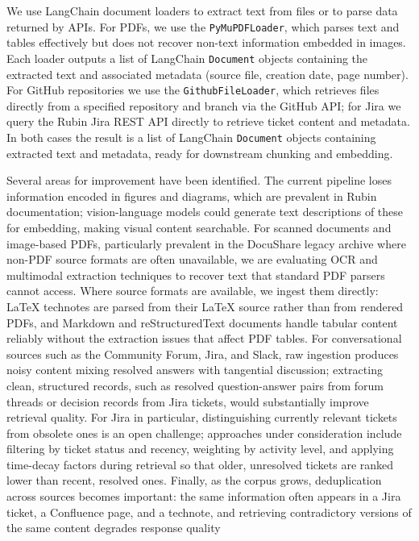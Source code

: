 We use LangChain document loaders to extract text from files or to parse data returned by APIs.
For PDFs, we use the \texttt{PyMuPDFLoader}, which parses text and tables effectively but does not recover non-text information embedded in images.
Each loader outputs a list of LangChain \texttt{Document} objects containing the extracted text and associated metadata (source file, creation date, page number).
For GitHub repositories we use the \texttt{GithubFileLoader}, which retrieves files directly from a specified repository and branch via the GitHub API; for Jira we query the Rubin Jira REST API directly to retrieve ticket content and metadata.
In both cases the result is a list of LangChain \texttt{Document} objects containing extracted text and metadata, ready for downstream chunking and embedding.

Several areas for improvement have been identified.
The current pipeline loses information encoded in figures and diagrams, which are prevalent in Rubin documentation; vision-language models could generate text descriptions of these for embedding, making visual content searchable.
For scanned documents and image-based PDFs, particularly prevalent in the \gls{DocuShare} legacy archive where non-PDF source formats are often unavailable, we are evaluating OCR and multimodal extraction techniques to recover text that standard PDF parsers cannot access.
Where source formats are available, we ingest them directly: LaTeX technotes are parsed from their LaTeX source rather than from rendered PDFs, and Markdown and reStructuredText documents handle tabular content reliably without the extraction issues that affect PDF tables.
For conversational sources such as the Community Forum, Jira, and Slack, raw ingestion produces noisy content mixing resolved answers with tangential discussion; extracting clean, structured records, such as resolved question-answer pairs from forum threads or decision records from Jira tickets, would substantially improve retrieval quality.
For Jira in particular, distinguishing currently relevant tickets from obsolete ones is an open challenge; approaches under consideration include filtering by ticket status and recency, weighting by activity level, and applying time-decay factors during retrieval so that older, unresolved tickets are ranked lower than recent, resolved ones.
Finally, as the corpus grows, deduplication across sources becomes important: the same information often appears in a Jira ticket, a Confluence page, and a technote, and retrieving contradictory versions of the same content degrades response quality

